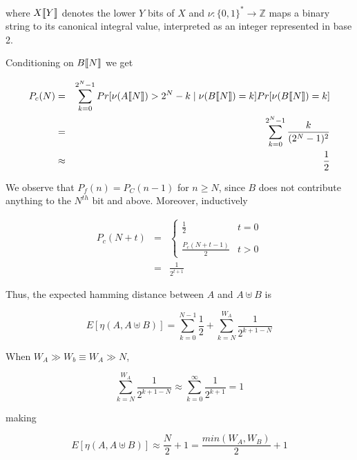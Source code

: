 where $X\llbracket Y \rrbracket $ denotes the lower $Y$ bits of $X$ and $\nu :
\{0, 1\}^* \to \mathbb{Z}$ maps a binary string to its canonical integral
value, interpreted as an integer represented in base 2.

Conditioning on $B\llbracket N \rrbracket $ we get

\begin{eqnarray*}
  \label{eq:approximation-before-N}
  P_c(N) & = & \displaystyle\sum\limits_{k=0}^{2^{N} - 1}
  Pr[\nu(A\sembrack{N}) > 2^N - k \mid \nu(B\sembrack{N}) = k]
  Pr[\nu(B\sembrack{N}) = k] \\
  & = & \displaystyle\sum\limits_{k=0}^{2^{N} - 1} \frac{k}{(2^N - 1)^2} \\
  & \approx & \frac{1}{2}
\end{eqnarray*}

We observe that $P_f(n) = P_C(n - 1)$ for $n \geq N$, since $B$ does
not contribute anything to the $N^{th}$ bit and above.  Moreover,
inductively

\begin{eqnarray*}
  P_c(N + t) & = &
  \begin{cases}
    \frac{1}{2} & t = 0 \\
    \\
    \frac{P_c(N + t - 1)}{2} & t > 0
  \end{cases} \\
  & = & \frac{1}{2^{t + 1}}
\end{eqnarray*}

Thus, the expected hamming distance between $A$ and $A \uplus B$ is

\begin{equation}
  \label{eq:no-assumptions}
  E[\eta(A, A \uplus B)] = \displaystyle\sum\limits_{k=0}^{N - 1} \frac{1}{2} + 
  \displaystyle\sum\limits_{k=N}^{W_A} \frac{1}{2^{k + 1 - N}}
\end{equation}

When $W_A \gg W_b \equiv W_A \gg N$, 

\begin{equation}
  \displaystyle\sum\limits_{k=N}^{W_A} \frac{1}{2^{k + 1 - N}} \approx
  \displaystyle\sum\limits_{k=0}^{\infty} \frac{1}{2^{k + 1}} = 1
\end{equation}

making

\begin{equation}
  E[\eta(A, A \uplus B)] \approx \frac{N}{2} + 1 = 
  \frac{min(W_A, W_B)}{2} + 1
\end{equation}

